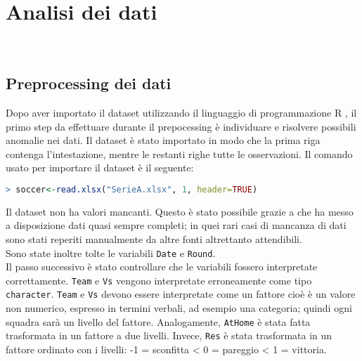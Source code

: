 
\chapter{Analisi dei dati}
\label{cap:Analisi}
\\


\section{Preprocessing dei dati}
Dopo aver importato il dataset utilizzando il linguaggio di programmazione R \autocite{R-language}, il primo step da effettuare durante il prepocessing è individuare e risolvere possibili anomalie nei dati.
Il dataset è stato importato in modo che la prima riga contenga l'intestazione, mentre le restanti righe tutte le osservazioni. Il comando usato per importare il dataset è il seguente:\\

\begin{lstlisting}[language=R]
	> soccer<-read.xlsx("SerieA.xlsx", 1, header=TRUE)
\end{lstlisting}
\bigskip
Il dataset non ha valori mancanti. Questo è stato possibile grazie a \texttt{\cite{fbref}} che ha messo a disposizione dati quasi sempre completi; in quei rari casi di mancanza di dati sono stati reperiti manualmente da altre fonti altrettanto attendibili.\\ 
Sono state inoltre tolte le variabili \texttt{Date} e \texttt{Round}.\\
Il passo successivo è stato controllare che le variabili fossero interpretate correttamente. \texttt{Team} e \texttt{Vs} vengono interpretate erroneamente come tipo \texttt{character}. \texttt{Team} e \texttt{Vs} devono essere interpretate come un fattore cioè è un valore non numerico, espresso in termini verbali, ad esempio una categoria; quindi ogni squadra sarà un livello del fattore. Analogamente, \texttt{AtHome} è stata fatta trasformata in un fattore a due livelli. Invece, \texttt{Res} è stata trasformata in un fattore ordinato con i livelli: -1 = sconfitta <  0 = pareggio < 1 = vittoria.


